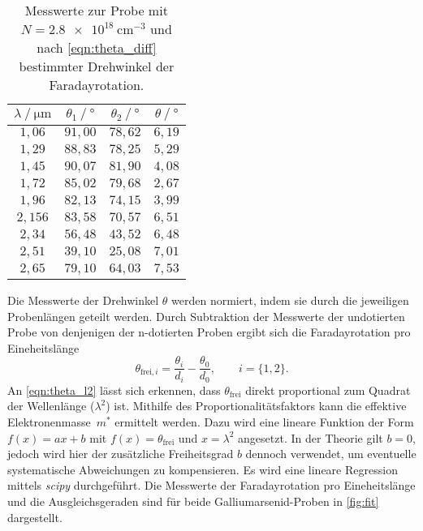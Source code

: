 \begin{table}
  \centering
  \caption{Messwerte zur Probe mit $N = \qty{2.8e18}{\centi\metre^{-3}}$ und nach \autoref{eqn:theta_diff} bestimmter Drehwinkel der Faradayrotation.}
  \label{tab:mw3}
  \begin{tabular}{c c c c}
    \toprule
    $\lambda \mathbin{/} \unit{\micro\meter}$ & $\theta_{1} \mathbin{/} \unit{\degree}$ & $\theta_{2} \mathbin{/} \unit{\degree}$ &%
     $\theta \mathbin{/} \unit{\degree}$ \\
    \midrule
    $1,06 $ & $91,00$ & $78,62$ & $6,19$ \\
    $1,29 $ & $88,83$ & $78,25$ & $5,29$ \\
    $1,45 $ & $90,07$ & $81,90$ & $4,08$ \\
    $1,72 $ & $85,02$ & $79,68$ & $2,67$ \\
    $1,96 $ & $82,13$ & $74,15$ & $3,99$ \\
    $2,156$ & $83,58$ & $70,57$ & $6,51$ \\
    $2,34 $ & $56,48$ & $43,52$ & $6,48$ \\
    $2,51 $ & $39,10$ & $25,08$ & $7,01$ \\
    $2,65 $ & $79,10$ & $64,03$ & $7,53$ \\
    \bottomrule
  \end{tabular}
\end{table}

Die Messwerte der Drehwinkel $\theta$ werden normiert, indem sie durch die jeweiligen Probenlängen geteilt werden. Durch Subtraktion der Messwerte der undotierten Probe von 
denjenigen der n-dotierten Proben ergibt sich die Faradayrotation pro Eineheitslänge 
\begin{equation*}
  \theta_{\text{frei}, i} = \frac{\theta_i}{d_i} - \frac{\theta_0}{d_0}, \qquad i = \{1, 2\}.
\end{equation*}
An \autoref{eqn:theta_l2} lässt sich erkennen, dass $\theta_\text{frei}$ direkt proportional zum Quadrat der Wellenlänge ($\lambda^2$) ist. Mithilfe des Proportionalitätsfaktors 
kann die effektive Elektronenmasse~$m^*$ ermittelt werden. Dazu wird eine lineare Funktion der Form $f(x) = ax + b$ mit $f(x) = \theta_\text{frei}$ und $x = \lambda^2$
angesetzt. In der Theorie gilt $b = 0$, jedoch wird hier der zusätzliche Freiheitsgrad $b$ dennoch verwendet, um eventuelle systematische Abweichungen zu kompensieren.
Es wird eine lineare Regression mittels \textit{scipy} \cite{scipy} durchgeführt. Die Messwerte der Faradayrotation pro Eineheitslänge und die Ausgleichsgeraden sind für 
beide Galliumarsenid-Proben in \autoref{fig:fit} dargestellt.

